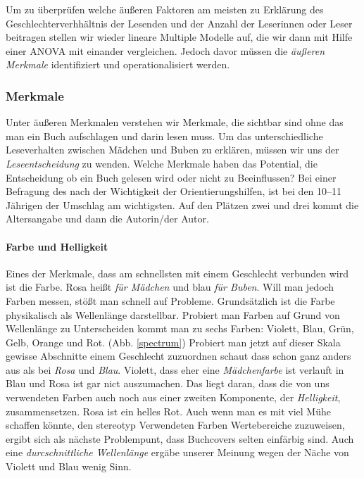 Um zu überprüfen welche äußeren Faktoren am meisten zu Erklärung des
Geschlechterverhhältnis der Lesenden und der Anzahl der Leserinnen oder
Leser beitragen stellen wir wieder lineare Multiple Modelle auf, die wir
dann mit Hilfe einer ANOVA mit einander vergleichen. Jedoch davor müssen
die \emph{äußeren Merkmale} identifiziert und operationalisiert werden.

\subsubsection{Merkmale}

\label{meth.merkmale}

Unter äußeren Merkmalen verstehen wir Merkmale, die sichtbar sind ohne
das man ein Buch aufschlagen und darin lesen muss. Um das
unterschiedliche Leseverhalten zwischen Mädchen und Buben zu erklären,
müssen wir uns der \emph{Leseentscheidung} zu wenden. Welche Merkmale
haben das Potential, die Entscheidung ob ein Buch gelesen wird oder
nicht zu Beeinflussen? Bei einer Befragung des
\textcite[32-39]{Boersenverein2007} nach der Wichtigkeit der
Orientierungshilfen, ist bei den 10--11 Jährigen der Umschlag am
wichtigsten. Auf den Plätzen zwei und drei kommt die Altersangabe und
dann die Autorin/der Autor.

\paragraph{Farbe und Helligkeit}

Eines der Merkmale, dass am schnellsten mit einem Geschlecht verbunden
wird ist die Farbe. Rosa heißt \emph{für Mädchen} und blau \emph{für
Buben}. Will man jedoch Farben messen, stößt man schnell auf Probleme.
Grundsätzlich ist die Farbe physikalisch als Wellenlänge darstellbar.
Probiert man Farben auf Grund von Wellenlänge zu Unterscheiden kommt man
zu sechs Farben: Violett, Blau, Grün, Gelb, Orange und Rot. (Abb.
\ref{spectrum}) Probiert man jetzt auf dieser Skala gewisse Abschnitte
einem Geschlecht zuzuordnen schaut dass schon ganz anders aus als bei
\emph{Rosa} und \emph{Blau}. Violett, dass eher eine \emph{Mädchenfarbe}
ist verlauft in Blau und Rosa ist gar nict auszumachen. Das liegt daran,
dass die von uns verwendeten Farben auch noch aus einer zweiten
Komponente, der \emph{Helligkeit}, zusammensetzen. Rosa ist ein helles
Rot. Auch wenn man es mit viel Mühe schaffen könnte, den stereotyp
Verwendeten Farben Wertebereiche zuzuweisen, ergibt sich als nächste
Problempunt, dass Buchcovers selten einfärbig sind. Auch eine
\emph{durcschnittliche Wellenlänge} ergäbe unserer Meinung wegen der
Näche von \zB Violett und Blau wenig Sinn.

